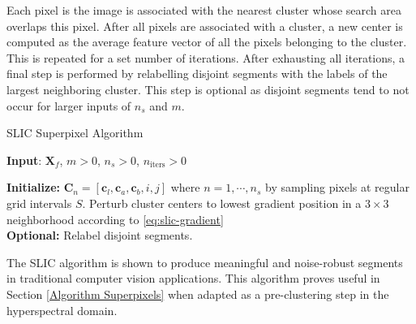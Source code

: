Each pixel is the image is associated with the nearest cluster whose search area overlaps this pixel. After all pixels are associated with a cluster, a new center is computed as the average feature vector of all the pixels belonging to the cluster. This is repeated for a set number of iterations. After exhausting all iterations, a final step is performed by relabelling disjoint segments with the labels of the largest neighboring cluster. This step is optional as disjoint segments tend to not occur for larger inputs of $n_s$ and $m$.

\begin{algorithm}[H]
    \caption{SLIC Superpixel Algorithm}
    \textbf{Input}: $\mathbf{X}_f$, $m > 0$, $n_s > 0$, $n_{\text{iters}} > 0$

    \textbf{Initialize:} $\mathbf{C}_n = [\mathbf{c}_{l}, \mathbf{c}_{a}, \mathbf{c}_{b}, i, j]$ where $n = 1, \cdots, n_s$ by sampling pixels at regular grid intervals $S$. Perturb cluster centers to lowest gradient position in a $3 \times 3$ neighborhood according to \eqref{eq:slic-gradient} \\
    
    \textbf{Optional:} Relabel disjoint segments.
\end{algorithm}

The SLIC algorithm is shown to produce meaningful and noise-robust segments in traditional computer vision applications. This algorithm proves useful in Section \ref{Algorithm Superpixels} when adapted as a pre-clustering step in the hyperspectral domain.
